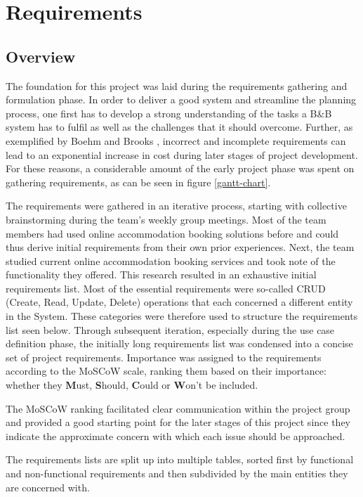 \chapter{Requirements}
\label{chapter:requirements}

\section{Overview}

The foundation for this project was laid during the requirements gathering and formulation phase. In order to deliver a good system and streamline the planning process, one first has to develop a strong understanding of the tasks a B\&B system has to fulfil as well as the challenges that it should overcome. Further, as exemplified by Boehm \cite{Boehm1988} and Brooks \cite{Brooks1975}, incorrect and incomplete requirements can lead to an exponential increase in cost during later stages of project development. For these reasons, a considerable amount of the early project phase was spent on gathering requirements, as can be seen in figure \ref{gantt-chart}.

The requirements were gathered in an iterative process, starting with collective brainstorming during the team's weekly group meetings. Most of the team members had used online accommodation booking solutions before and could thus derive initial requirements from their own prior experiences. Next, the team studied current online accommodation booking services and took note of the functionality they offered. This research resulted in an exhaustive initial requirements list. Most of the essential requirements were so-called CRUD (Create, Read, Update, Delete) operations that each concerned a different entity in the System. These categories were therefore used to structure the requirements list seen below. Through subsequent iteration, especially during the use case definition phase, the initially long requirements list was condensed into a concise set of project requirements. Importance was assigned to the requirements according to the MoSCoW scale, ranking them based on their importance: whether they \textbf{M}ust, \textbf{S}hould, \textbf{C}ould or \textbf{W}on't be included.

The MoSCoW ranking facilitated clear communication within the project group and provided a good starting point for the later stages of this project since they indicate the approximate concern with which each issue should be approached.

The requirements lists are split up into multiple tables, sorted first by functional and non-functional requirements and then subdivided by the main entities they are concerned with.

